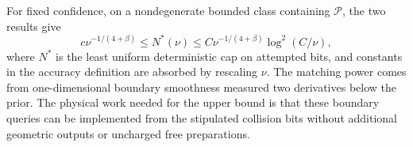 For fixed confidence, on a nondegenerate bounded class containing
$\mathcal P$, the two results give
\begin{equation}\label{eq:matched-power}
 c\nu^{-1/(4+\beta)}\le N^*(\nu)
          \le C\nu^{-1/(4+\beta)}\log^2(C/\nu),
\end{equation}
where $N^*$ is the least uniform deterministic cap on attempted bits,
and constants in the accuracy definition are absorbed by rescaling
$\nu$. The matching power comes from one-dimensional boundary
smoothness measured two derivatives below the prior. The physical
work needed for the upper bound is that these boundary queries can
be implemented from the stipulated collision bits without additional
geometric outputs or uncharged free preparations.
